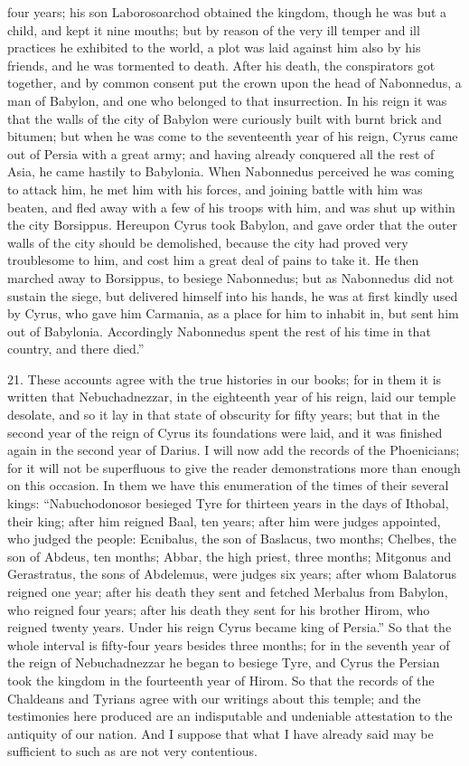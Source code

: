 four years; his son Laborosoarchod obtained the kingdom, though he was but
a child, and kept it nine mouths; but by reason of the very ill temper and
ill practices he exhibited to the world, a plot was laid against him also
by his friends, and he was tormented to death. After his death, the
conspirators got together, and by common consent put the crown upon the
head of Nabonnedus, a man of Babylon, and one who belonged to that
insurrection. In his reign it was that the walls of the city of Babylon
were curiously built with burnt brick and bitumen; but when he was come to
the seventeenth year of his reign, Cyrus came out of Persia with a great
army; and having already conquered all the rest of Asia, he came hastily
to Babylonia. When Nabonnedus perceived he was coming to attack him, he
met him with his forces, and joining battle with him was beaten, and fled
away with a few of his troops with him, and was shut up within the city
Borsippus. Hereupon Cyrus took Babylon, and gave order that the outer
walls of the city should be demolished, because the city had proved very
troublesome to him, and cost him a great deal of pains to take it. He then
marched away to Borsippus, to besiege Nabonnedus; but as Nabonnedus did
not sustain the siege, but delivered himself into his hands, he was at
first kindly used by Cyrus, who gave him Carmania, as a place for him to
inhabit in, but sent him out of Babylonia. Accordingly Nabonnedus spent
the rest of his time in that country, and there died.''

21. These accounts agree with the true histories in our books; for in them
it is written that Nebuchadnezzar, in the eighteenth year of his reign,
laid our temple desolate, and so it lay in that state of obscurity for
fifty years; but that in the second year of the reign of Cyrus its
foundations were laid, and it was finished again in the second year of
Darius. I will now add the records of the Phoenicians; for it will not be
superfluous to give the reader demonstrations more than enough on this
occasion. In them we have this enumeration of the times of their several
kings: ``Nabuchodonosor besieged Tyre for thirteen years in the days of
Ithobal, their king; after him reigned Baal, ten years; after him were
judges appointed, who judged the people: Ecnibalus, the son of Baslacus,
two months; Chelbes, the son of Abdeus, ten months; Abbar, the high
priest, three months; Mitgonus and Gerastratus, the sons of Abdelemus,
were judges six years; after whom Balatorus reigned one year; after his
death they sent and fetched Merbalus from Babylon, who reigned four years;
after his death they sent for his brother Hirom, who reigned twenty years.
Under his reign Cyrus became king of Persia.'' So that the whole interval
is fifty-four years besides three months; for in the seventh year of the
reign of Nebuchadnezzar he began to besiege Tyre, and Cyrus the Persian
took the kingdom in the fourteenth year of Hirom. So that the records of
the Chaldeans and Tyrians agree with our writings about this temple; and
the testimonies here produced are an indisputable and undeniable
attestation to the antiquity of our nation. And I suppose that what I have
already said may be sufficient to such as are not very contentious.

